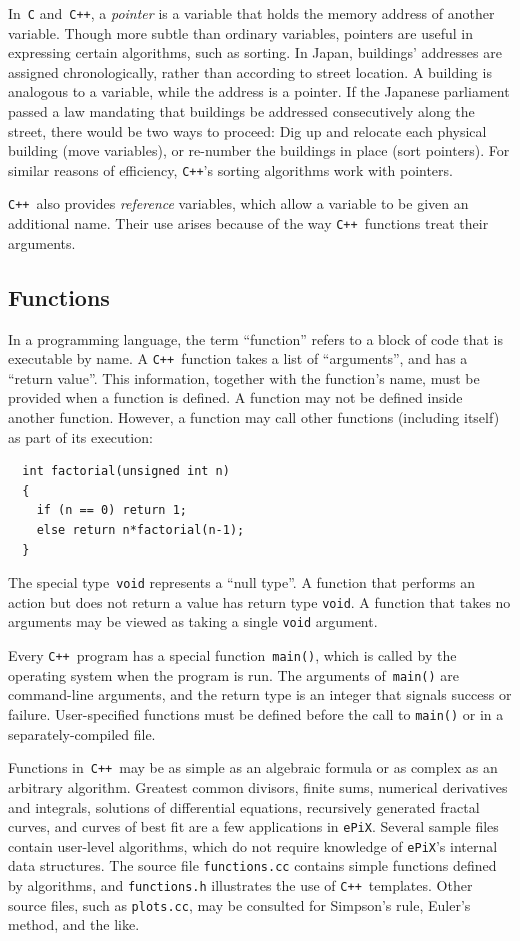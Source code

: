\documentclass[12pt]{report}
\newcommand{\code}[1]{\texttt{#1}}
\newcommand{\filename}[1]{\texttt{#1}}
\newcommand{\ePiX}{\code{ePiX}}
\newcommand{\CXX}{\code{C++}}
\begin{document}
In~\code{C} and~\CXX, a \emph{pointer} is a variable that holds the
memory address of another variable. Though more subtle than ordinary
variables, pointers are useful in expressing certain algorithms, such
as sorting. In Japan, buildings' addresses are assigned
chronologically, rather than according to street location. A building
is analogous to a variable, while the address is a pointer. If the
Japanese parliament passed a law mandating that buildings be addressed
consecutively along the street, there would be two ways to proceed:
Dig up and relocate each physical building (move variables), or
re-number the buildings in place (sort pointers). For similar reasons
of efficiency, \CXX's sorting algorithms work with pointers.

\CXX\ also provides \emph{reference} variables, which allow a variable
to be given an additional name. Their use arises because of the way
\CXX\ functions treat their arguments.


\subsection*{Functions}

 In a programming language, the term ``function''
refers to a block of code that is executable by name.  A \CXX\ 
function takes a list of ``arguments'', and has a ``return value''.
This information, together with the function's name, must be provided
when a function is defined.  A function may not be defined inside
another function. However, a function may call other functions
(including itself) as part of its execution:
\begin{verbatim}
  int factorial(unsigned int n)
  {
    if (n == 0) return 1;
    else return n*factorial(n-1);
  }
\end{verbatim}

The special type~\code{void} represents a ``null type''. A function
that performs an action but does not return a value has return type
\code{void}. A function that takes no arguments may be viewed as
taking a single \code{void} argument.

Every \CXX\ program has a special function~\code{main()}, which is
called by the operating system when the program is run. The arguments
of~\code{main()} are command-line arguments, and the return type is an
integer that signals success or failure. User-specified functions must
be defined before the call to \code{main()} or in a
separately-compiled file.

Functions in~\CXX\ may be as simple as an algebraic formula or as
complex as an arbitrary algorithm. Greatest common divisors, finite
sums, numerical derivatives and integrals, solutions of differential
equations, recursively generated fractal curves, and curves of best
fit are a few applications in \ePiX. Several sample files contain
user-level algorithms, which do not require knowledge of \ePiX's
internal data structures. The source file \filename{functions.cc}
contains simple functions defined by algorithms, and
\filename{functions.h} illustrates the use of \CXX\ templates. Other
source files, such as \filename{plots.cc}, may be consulted for
Simpson's rule, Euler's method, and the like.
\end{document}
